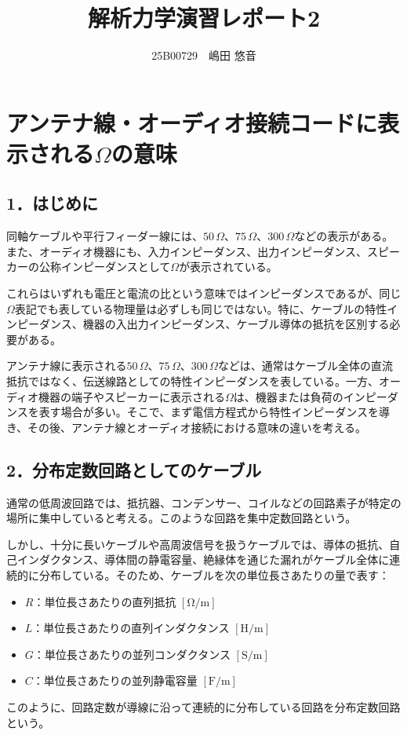 \documentclass[platex,dvipdfmx,a4paper]{jsarticle}
\title{解析力学演習レポート2}
\author{25B00729　嶋田 悠音}
\begin{document}
\maketitle
\clearpage

\section*{アンテナ線・オーディオ接続コードに表示される$\Omega$の意味}

\subsection*{1．はじめに}

同軸ケーブルや平行フィーダー線には、$50\,\Omega$、$75\,\Omega$、$300\,\Omega$などの表示がある。また、オーディオ機器にも、入力インピーダンス、出力インピーダンス、スピーカーの公称インピーダンスとして$\Omega$が表示されている。

これらはいずれも電圧と電流の比という意味ではインピーダンスであるが、同じ$\Omega$表記でも表している物理量は必ずしも同じではない。特に、ケーブルの特性インピーダンス、機器の入出力インピーダンス、ケーブル導体の抵抗を区別する必要がある。

アンテナ線に表示される$50\,\Omega$、$75\,\Omega$、$300\,\Omega$などは、通常はケーブル全体の直流抵抗ではなく、伝送線路としての特性インピーダンスを表している。一方、オーディオ機器の端子やスピーカーに表示される$\Omega$は、機器または負荷のインピーダンスを表す場合が多い。そこで、まず電信方程式から特性インピーダンスを導き、その後、アンテナ線とオーディオ接続における意味の違いを考える。

\subsection*{2．分布定数回路としてのケーブル}

通常の低周波回路では、抵抗器、コンデンサー、コイルなどの回路素子が特定の場所に集中していると考える。このような回路を集中定数回路という。

しかし、十分に長いケーブルや高周波信号を扱うケーブルでは、導体の抵抗、自己インダクタンス、導体間の静電容量、絶縁体を通じた漏れがケーブル全体に連続的に分布している。そのため、ケーブルを次の単位長さあたりの量で表す：
\begin{itemize}
  \item $R$：単位長さあたりの直列抵抗 $\mathrm{[\Omega/m]}$
  \item $L$：単位長さあたりの直列インダクタンス $\mathrm{[H/m]}$
  \item $G$：単位長さあたりの並列コンダクタンス $\mathrm{[S/m]}$
  \item $C$：単位長さあたりの並列静電容量 $\mathrm{[F/m]}$
\end{itemize}
このように、回路定数が導線に沿って連続的に分布している回路を分布定数回路という。
\end{document}
